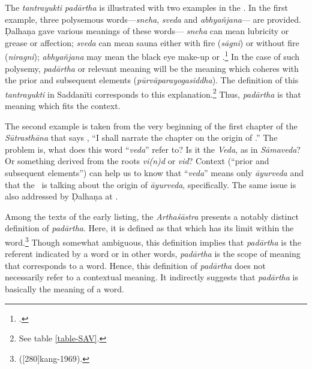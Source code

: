The \emph{tantrayukti} \emph{padārtha} is illustrated with two examples in the 
\SS. In the first example, three polysemous words---\emph{sneha}, 
\emph{sveda} 
and \emph{abhyañjana}— are provided. Ḍalhaṇa gave various meanings of 
these 
words--- \emph{sneha} can mean lubricity or grease or affection; \emph{sveda} 
can mean sauna either with fire (\emph{sāgni}) or without fire (\emph{niragni}); 
\emph{abhyañjana} may mean the black eye make-up or .\footnote{ 
.} 
In the case of such polysemy, \emph{padārtha} or relevant meaning will be the 
meaning which coheres with the prior and subsequent elements 
(\emph{pūrvāparayogasiddha}). The definition of this \emph{tantrayukti} in 
Saddanīti corresponds to this explanation.\footnote{See table \ref{table-SAV}.} 
Thus, \emph{padārtha} is that meaning which fits the context.   

The second example is taken from the very beginning of the first chapter of 
the \emph{Sūtrasthāna} that says , 
“I shall narrate the chapter on the origin of .” 
The problem is, what does this word “\emph{veda}” refer to?  
Is it the \emph{Veda}, as in \emph{Sāmaveda}?  Or
something derived from the roots \root \emph{vi(n)d} or \root \emph{vid}?  
Context (“prior and subsequent elements”) can help us to know that 
“\emph{veda}”
means only \emph{āyurveda} and that the \SS\ is talking about the
origin of \emph{āyurveda}, specifically.  
The same issue is also addressed by Ḍalhaṇa at .

Among the texts of the early listing, 
the \emph{Arthaśāstra} presents a notably distinct definition of 
\emph{padārtha}. 
Here, it is defined as that which has its limit within the word.\footnote{
	 ([280]{kang-1969}).}
Though somewhat ambiguous, this definition implies 
that \emph{padārtha} is the referent indicated by a word or in other words, 
\emph{padārtha} is the scope of meaning that corresponds to a word. 
Hence, this definition of \emph{padārtha} does not necessarily refer to a 
contextual meaning. 
It indirectly suggests that \emph{padārtha} is basically the meaning of a word. 

